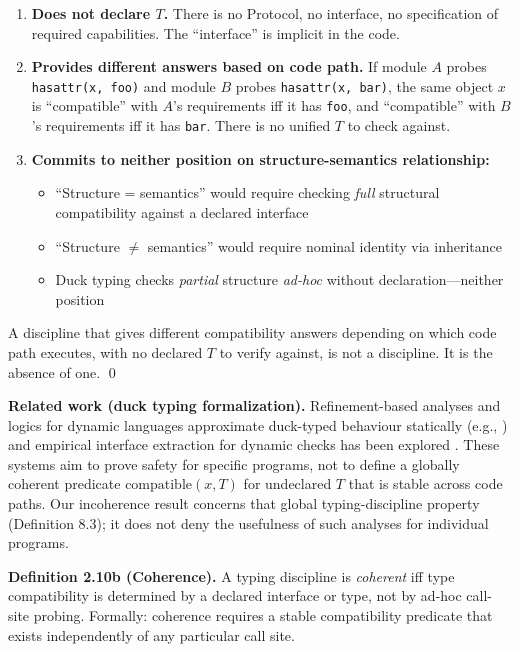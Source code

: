 \begin{enumerate}
\def\labelenumi{\arabic{enumi}.}
\item
  \textbf{Does not declare \(T\).} There is no Protocol, no interface,
  no specification of required capabilities. The ``interface'' is
  implicit in the code.
\item
  \textbf{Provides different answers based on code path.} If module
  \(A\) probes
  \texttt{hasattr(x,\ \textquotesingle{}foo\textquotesingle{})} and
  module \(B\) probes
  \texttt{hasattr(x,\ \textquotesingle{}bar\textquotesingle{})}, the
  same object \(x\) is ``compatible'' with \(A\)'s requirements iff it
  has \texttt{foo}, and ``compatible'' with \(B\)'s requirements iff it
  has \texttt{bar}. There is no unified \(T\) to check against.
\item
  \textbf{Commits to neither position on structure-semantics
  relationship:}

  \begin{itemize}
  \tightlist
  \item
    ``Structure = semantics'' would require checking \emph{full}
    structural compatibility against a declared interface
  \item
    ``Structure $\neq$ semantics'' would require nominal identity via
    inheritance
  \item
    Duck typing checks \emph{partial} structure \emph{ad-hoc} without
    declaration---neither position
  \end{itemize}
\end{enumerate}

A discipline that gives different compatibility answers depending on
which code path executes, with no declared \(T\) to verify against, is
not a discipline. It is the absence of one. \qed

\textbf{Related work (duck typing formalization).} Refinement-based
analyses and logics for dynamic languages approximate duck-typed
behaviour statically (e.g., \cite{chugh2012nested,systemDArxiv}) and
empirical interface extraction for dynamic checks has been explored
\cite{lamaison2012duck}. These systems aim to prove safety for specific
programs, not to define a globally coherent predicate
\(\text{compatible}(x,T)\) for undeclared \(T\) that is stable across
code paths. Our incoherence result concerns that global typing-discipline
property (Definition 8.3); it does not deny the usefulness of such
analyses for individual programs.

\textbf{Definition 2.10b (Coherence).} A typing discipline is \emph{coherent} iff type compatibility is determined by a declared interface or type, not by ad-hoc call-site probing. Formally: coherence requires a stable compatibility predicate that exists independently of any particular call site.

